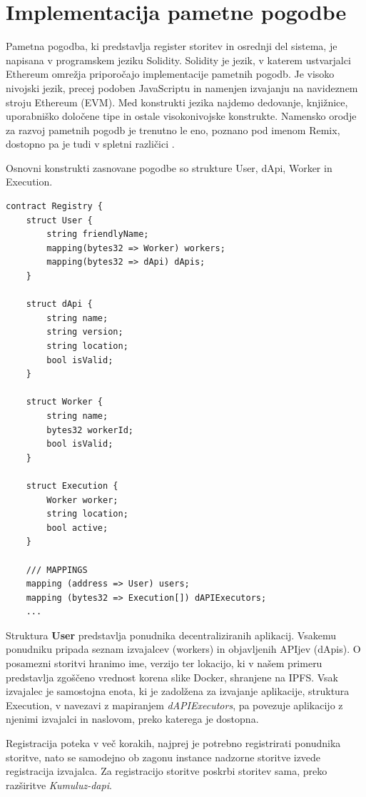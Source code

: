 \documentclass[a4paper, 12pt]{book}
\begin{document}
\section{Implementacija pametne pogodbe}
Pametna pogodba, ki predstavlja register storitev in osrednji del sistema, je napisana v programskem jeziku Solidity.
Solidity je jezik, v katerem ustvarjalci Ethereum omrežja priporočajo implementacije pametnih pogodb.
Je visoko nivojski jezik, precej podoben JavaScriptu in namenjen izvajanju na navideznem stroju Ethereum (EVM).
Med konstrukti jezika najdemo dedovanje, knjižnice, uporabniško določene tipe in ostale visokonivojske konstrukte.
Namensko orodje za razvoj pametnih pogodb je trenutno le eno, poznano pod imenom Remix, dostopno pa je tudi v spletni različici
\cite{solidityDocs}.

Osnovni konstrukti zasnovane pogodbe so strukture User, dApi, Worker in Execution.

\begin{lstlisting}
contract Registry {
	struct User {
		string friendlyName;
		mapping(bytes32 => Worker) workers;
		mapping(bytes32 => dApi) dApis;
	}
	
	struct dApi {
		string name;
		string version;
		string location;
		bool isValid;
	}
	
	struct Worker {
		string name;
		bytes32 workerId;
		bool isValid;
	}
	
	struct Execution {
		Worker worker;
		string location;
		bool active;
	}
	
 	/// MAPPINGS
	mapping (address => User) users;
	mapping (bytes32 => Execution[]) dAPIExecutors;
	...
\end{lstlisting}

Struktura \textbf{User} predstavlja ponudnika decentraliziranih aplikacij.
Vsakemu ponudniku pripada seznam izvajalcev (workers) in objavljenih APIjev (dApis).
O posamezni storitvi hranimo ime, verzijo ter lokacijo, ki v našem primeru predstavlja zgoščeno vrednost korena slike Docker, shranjene na IPFS.
Vsak izvajalec je samostojna enota, ki je zadolžena za izvajanje aplikacije, struktura Execution, v navezavi z mapiranjem \textit{dAPIExecutors}, pa povezuje aplikacijo z njenimi izvajalci in naslovom, preko katerega je dostopna.

Registracija poteka v več korakih, najprej je potrebno registrirati ponudnika storitve, nato se samodejno ob zagonu instance nadzorne storitve izvede registracija izvajalca.
Za registracijo storitve poskrbi storitev sama, preko razširitve \textit{Kumuluz-dapi}.
\end{document}
